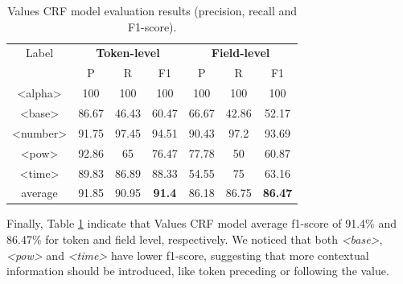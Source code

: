 \documentclass[sigconf]{acmart}
\begin{document}
\begin{table}[ht]
  \caption{Values CRF model evaluation results (precision, recall and F1-score).}
  \label{tab:values-evaluation}
  \begin{tabular}{c|ccc|ccc}
    \toprule
    Label & \multicolumn{3}{c}{\textbf{Token-level}} & \multicolumn{3}{c}{\textbf{Field-level}}\\
    & P & R & F1 & P & R & F1 \\
    \midrule
    <alpha>       & 100   & 100   & 100   & 100   & 100   & 100     \\
    <base>        & 86.67 & 46.43 & 60.47 & 66.67 & 42.86 & 52.17   \\
    <number>      & 91.75 & 97.45 & 94.51 & 90.43 & 97.2  & 93.69   \\
    <pow>         & 92.86 & 65    & 76.47 & 77.78 & 50    & 60.87   \\
    <time>        & 89.83 & 86.89 & 88.33 & 54.55 & 75    & 63.16   \\
    \midrule
    average       & 91.85 & 90.95 & \textbf{91.4} & 86.18 & 86.75 & \textbf{86.47}   \\
    \bottomrule
     \end{tabular}
\end{table}

Finally, Table \ref{tab:values-evaluation} indicate that Values CRF model average f1-score of 91.4\% and 86.47\% for token and field level, respectively. We noticed that both \textit{<base>}, \textit{<pow>} and \textit{<time>} have lower f1-score, suggesting that more contextual information should be introduced, like token preceding or following the value. 
\end{document}
